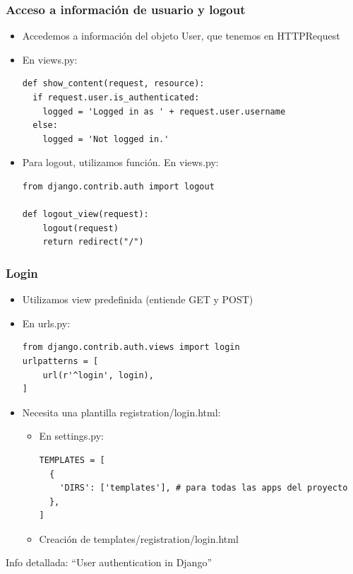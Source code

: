 \begin{frame}[fragile]
\frametitle{Acceso a información de usuario y logout}

\begin{itemize}
\item Accedemos a información del objeto User, que tenemos en HTTPRequest
\item En views.py:
\begin{verbatim}
def show_content(request, resource):
  if request.user.is_authenticated:
    logged = 'Logged in as ' + request.user.username
  else:
    logged = 'Not logged in.'
\end{verbatim}
\item Para logout, utilizamos función. En views.py:
\begin{verbatim}
from django.contrib.auth import logout

def logout_view(request):
    logout(request)
    return redirect("/")
\end{verbatim}
\end{itemize}
\end{frame}


\begin{frame}[fragile]
\frametitle{Login}

\begin{itemize}
\item Utilizamos view predefinida (entiende GET y POST)
\item En urls.py:
\begin{verbatim}
from django.contrib.auth.views import login
urlpatterns = [
    url(r'^login', login),
]
\end{verbatim}
\item Necesita una plantilla registration/login.html:
  \begin{itemize}
  \item En settings.py:
\begin{verbatim}
TEMPLATES = [
  {
    'DIRS': ['templates'], # para todas las apps del proyecto
  },
]
\end{verbatim}
  \item Creación de templates/registration/login.html
  \end{itemize}
\end{itemize}

\begin{flushright}
Info detallada: ``User authentication in Django''
\end{flushright}
\end{frame}

